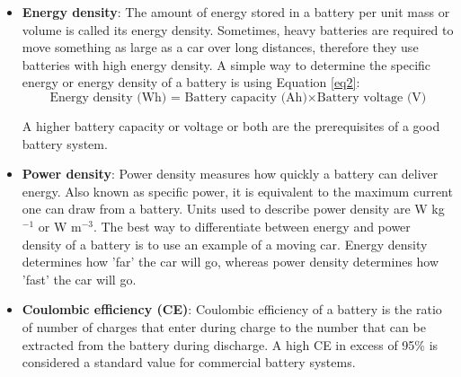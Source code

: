 \begin{itemize}
\item \textbf{Energy density}: The amount of energy stored in a battery per unit mass or volume is called its energy density. Sometimes, heavy batteries are required to move something as large as a car over long distances, therefore they use batteries with high energy density. A simple way to determine the specific energy or energy density of a battery is using Equation \ref{eq2}:
\begin{equation} \label{eq2}
    \text{Energy density (Wh) = } \text{Battery capacity (Ah)} \times \text{Battery voltage (V)}
\end{equation}

A higher battery capacity or voltage or both are the prerequisites of a good battery system. 

\item \textbf{Power density}: Power density measures how quickly a battery can deliver energy. Also known as specific power, it is equivalent to the maximum current one can draw from a battery. Units used to describe power density are W kg$^{-1}$ or W m$^{-3}$. The best way to differentiate between energy and power density of a battery is to use an example of a moving car. Energy density determines how 'far' the car will go, whereas power density determines how 'fast' the car will go.

\item \textbf{Coulombic efficiency (CE)}: Coulombic efficiency of a battery is the ratio of number of charges that enter during charge to the number that can be extracted from the battery during discharge. A high CE in excess of 95\% is considered a standard value for commercial battery systems. 
\end{itemize}

